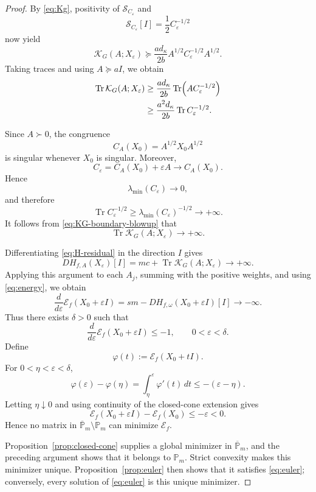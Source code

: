 \documentclass[11pt]{amsart}
\theoremstyle{definition}
\theoremstyle{remark}
\newcommand{\Pm}{\mathbb P_m}
\newcommand{\Tr}{\operatorname{Tr}}
\begin{document}
\begin{proof}
		By \eqref{eq:Kg}, positivity of
		$\mathcal S_{C_\varepsilon}$ and
		\[
		\mathcal S_{C_\varepsilon}[I]
		=\frac12C_\varepsilon^{-1/2}
		\]
		now yield
		\[
		\mathcal K_G(A;X_\varepsilon)
		\succeq
		\frac{ad_\kappa}{2b}
		A^{1/2}C_\varepsilon^{-1/2}A^{1/2}.
		\]
		Taking traces and using $A\succeq aI$, we obtain
		\begin{align}
			\Tr\mathcal K_G(A;X_\varepsilon)
			&\ge
			\frac{ad_\kappa}{2b}
			\Tr\!\left(AC_\varepsilon^{-1/2}\right) \notag\\
			&\ge
			\frac{a^2d_\kappa}{2b}
			\Tr C_\varepsilon^{-1/2}.
			\label{eq:KG-boundary-blowup}
		\end{align}
		
		Since $A\succ0$, the congruence
		\[
		C_A(X_0)=A^{1/2}X_0A^{1/2}
		\]
		is singular whenever $X_0$ is singular.  Moreover,
		\[
		C_\varepsilon=C_A(X_0)+\varepsilon A
		\longrightarrow C_A(X_0).
		\]
		Hence
		\[
		\lambda_{\min}(C_\varepsilon)\longrightarrow0,
		\]
		and therefore
		\[
		\Tr C_\varepsilon^{-1/2}
		\ge
		\lambda_{\min}(C_\varepsilon)^{-1/2}
		\longrightarrow+\infty.
		\]
		It follows from \eqref{eq:KG-boundary-blowup} that
		\[
		\Tr\mathcal K_G(A;X_\varepsilon)
		\longrightarrow+\infty.
		\]
		
		Differentiating \eqref{eq:H-residual} in the direction $I$ gives
		\[
		DH_{f,A}(X_\varepsilon)[I]
		=mc+\Tr\mathcal K_G(A;X_\varepsilon)
		\longrightarrow+\infty.
		\]
		Applying this argument to each $A_j$, summing with the positive
		weights, and using \eqref{eq:energy}, we obtain
		\[
		\frac{d}{d\varepsilon}
		\mathcal E_f(X_0+\varepsilon I)
		=
		sm-DH_{f,\omega}(X_0+\varepsilon I)[I]
		\longrightarrow-\infty.
		\]
		Thus there exists $\delta>0$ such that
		\[
		\frac{d}{d\varepsilon}
		\mathcal E_f(X_0+\varepsilon I)\le-1,
		\qquad 0<\varepsilon<\delta.
		\]
		Define
		\[
		\varphi(t):=\mathcal E_f(X_0+tI).
		\]
		For $0<\eta<\varepsilon<\delta$,
		\[
		\varphi(\varepsilon)-\varphi(\eta)
		=\int_\eta^\varepsilon\varphi'(t)\,dt
		\le-(\varepsilon-\eta).
		\]
		Letting $\eta\downarrow0$ and using continuity of the closed-cone
		extension gives
		\[
		\mathcal E_f(X_0+\varepsilon I)
		-\mathcal E_f(X_0)
		\le-\varepsilon<0.
		\]
		Hence no matrix in
		$\overline{\mathbb{P}}_m\setminus\Pm$ can minimize $\mathcal E_f$.
		
		Proposition~\ref{prop:closed-cone} supplies a global minimizer in
		$\overline{\mathbb{P}}_m$, and the preceding argument shows that it belongs to
		$\Pm$.  Strict convexity makes this minimizer unique.
		Proposition~\ref{prop:euler} then shows that it satisfies
		\eqref{eq:euler}; conversely, every solution of \eqref{eq:euler} is
		this unique minimizer.
\end{proof}
	
\end{document}

